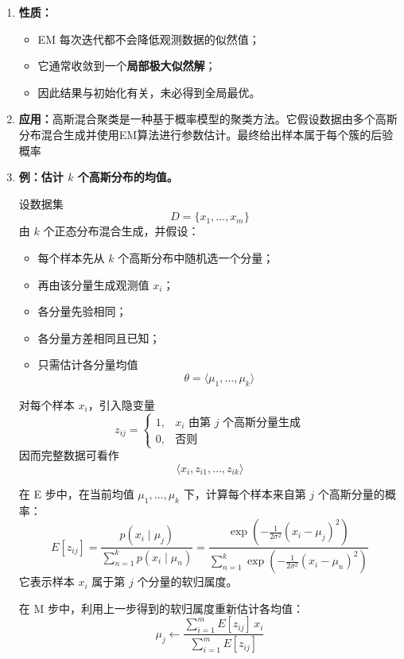 \documentclass[../main.tex]{subfiles}
\begin{document}
\begin{enumerate}
    \item \textbf{性质：}
    \begin{itemize}
        \item EM 每次迭代都不会降低观测数据的似然值；
        \item 它通常收敛到一个\textbf{局部极大似然解}；
        \item 因此结果与初始化有关，未必得到全局最优。
    \end{itemize}

	\item \textbf{应用：}高斯混合聚类是一种基于概率模型的聚类方法。它假设数据由多个高斯分布混合生成并使用EM算法进行参数估计。最终给出样本属于每个簇的后验概率

    \item \textbf{例：估计 $k$ 个高斯分布的均值。}
    
    {\small\kaishu
    设数据集
    $$
    D=\{x_1,\ldots,x_m\}
    $$
    由 $k$ 个正态分布混合生成，并假设：
    \begin{itemize}
        \item 每个样本先从 $k$ 个高斯分布中随机选一个分量；
        \item 再由该分量生成观测值 $x_i$；
        \item 各分量先验相同；
        \item 各分量方差相同且已知；
        \item 只需估计各分量均值
        $$
        \theta=\langle \mu_1,\ldots,\mu_k\rangle
        $$
    \end{itemize}

    对每个样本 $x_i$，引入隐变量
    $$
    z_{ij}=
    \begin{cases}
    1, & x_i \text{ 由第 } j \text{ 个高斯分量生成}\\
    0, & \text{否则}
    \end{cases}
    $$
    因而完整数据可看作
    $$
    \langle x_i,z_{i1},\ldots,z_{ik}\rangle
    $$

    在 E 步中，在当前均值 $\mu_1,\ldots,\mu_k$ 下，计算每个样本来自第 $j$ 个高斯分量的概率：
    $$
    E[z_{ij}]
    =
    \frac{p(x_i\mid \mu_j)}
    {\sum_{n=1}^{k}p(x_i\mid \mu_n)}
    =
    \frac{\exp\!\left(-\frac{1}{2\sigma^2}(x_i-\mu_j)^2\right)}
    {\sum_{n=1}^{k}\exp\!\left(-\frac{1}{2\sigma^2}(x_i-\mu_n)^2\right)}
    $$
    它表示样本 $x_i$ 属于第 $j$ 个分量的软归属度。

    在 M 步中，利用上一步得到的软归属度重新估计各均值：
    $$
    \mu_j
    \leftarrow
    \frac{\sum_{i=1}^{m}E[z_{ij}]\,x_i}
    {\sum_{i=1}^{m}E[z_{ij}]}
    $$
    }

\end{enumerate}
\end{document}
